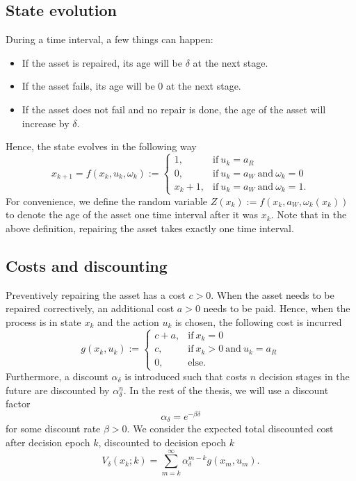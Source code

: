 \subsection{State evolution}
During a time interval, a few things can happen:
\begin{itemize}
	\item If the asset is repaired, its age will be $\delta$ at the next stage.
	\item If the asset fails, its age will be $0$ at the next stage.
	\item If the asset does not fail and no repair is done, the age of the asset will increase by $\delta$.
\end{itemize}
Hence, the state evolves in the following way
$$
x_{k+1}=f(x_k,u_k,\omega_k):=\begin{cases}
1,&\text{if}\ u_k=a_R \\
0,&\text{if}\ u_k=a_W\ \text{and}\ \omega_k=0 \\
x_k+1,&\text{if}\ u_k=a_W\ \text{and}\ \omega_k=1.
\end{cases}
$$
For convenience, we define the random variable $Z(x_k):=f(x_k,a_W,\omega_k(x_k))$ to denote the age of the asset one time interval after it was $x_k$.
Note that in the above definition, repairing the asset takes exactly one time interval.

\subsection{Costs and discounting}
Preventively repairing the asset has a cost $c>0$.
When the asset needs to be repaired correctively, an additional cost $a>0$ needs to be paid.
Hence, when the process is in state $x_k$ and the action $u_k$ is chosen, the following cost is incurred
$$
g(x_k,u_k):=\begin{cases}
c+a,&\text{if}\ x_k=0 \\
c,&\text{if}\ x_k>0\ \text{and}\ u_k=a_R \\
0,&\text{else}.
\end{cases}
$$
Furthermore, a discount $\alpha_\delta$ is introduced such that costs $n$ decision stages in the future are discounted by $\alpha_\delta^n$.
In the rest of the thesis, we will use a discount factor
$$
\alpha_\delta=e^{-\beta\delta}
$$
for some discount rate $\beta>0$.
We consider the expected total discounted cost after decision epoch $k$, discounted to decision epoch $k$
$$
V_\delta(x_k;k)=\sum\limits_{m=k}^\infty \alpha_\delta^{m-k}g(x_m,u_m).
$$


